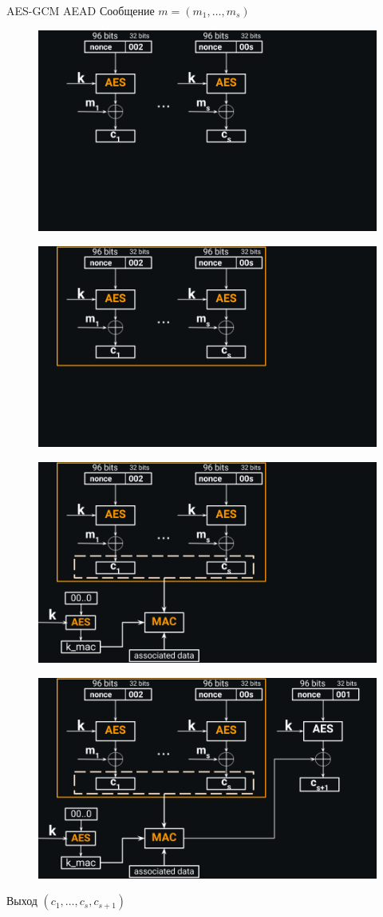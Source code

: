 \documentclass[usenames,dvipsnames,8pt,aspectratio=169]{beamer}
\begin{document}
\begin{frame}{AES-GCM AEAD}
\Large Сообщение $m=(m_1, \ldots, m_s)$
{
	\begin{figure}
		\includegraphics[width=0.7\linewidth]{AES_GCM_AEAD_1}
	\end{figure}
}
{
	\begin{figure}
		\includegraphics[width=0.7\linewidth]{AES_GCM_AEAD_2}
	\end{figure}
}
{
	\begin{figure}
		\includegraphics[width=0.7\linewidth]{AES_GCM_AEAD_3}
	\end{figure}
}
{
	\begin{figure}
		\includegraphics[width=0.7\linewidth]{AES_GCM_AEAD_full}
	\end{figure}
Выход $(c_1, \ldots, c_s, c_{s+1})$
}
\end{frame}
\end{document}
